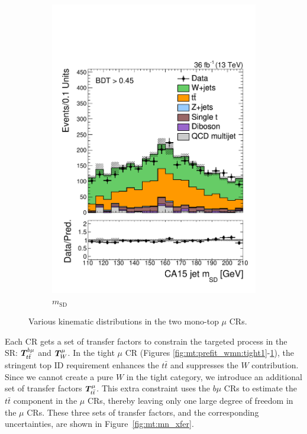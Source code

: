 \begin{figure}[]
\begin{center}
\begin{subfigure}[t]{0.32\textwidth}
            \includegraphics[width=\textwidth]{figures/monotop/prefit/singlemuonw_tight_fj1MSD.pdf}
            \caption{$m_\mathrm{SD}$}
            \label{fig:mt:prefit_wmn:tight2}
        \end{subfigure}
        \caption{Various kinematic distributions in the two mono-top $\mu$ CRs. }
        \label{fig:mt:prefit_wmn}
    \end{center}
\end{figure}

Each CR gets a set of transfer factors to constrain the targeted process in the SR: $\bm{T}^{b\mu}_{t\bar{t}}$ and $\bm{T}^{\mu}_{W}$.
In the tight $\mu$ CR (Figures \ref{fig:mt:prefit_wmn:tight1}-\ref{fig:mt:prefit_wmn:tight2}), the stringent top ID requirement enhances the $t\bar{t}$ and suppresses the $W$ contribution.
Since we cannot create a pure $W$ in the tight category, we introduce an additional set of transfer factors $\bm{T}^{\mu}_{t\bar{t}}$.
This extra constraint uses the $b\mu$ CRs to estimate the $t\bar{t}$ component in the $\mu$ CRs, thereby leaving only one large degree of freedom in the $\mu$ CRs.
These three sets of transfer factors, and the corresponding uncertainties, are shown in Figure~\ref{fig:mt:mn_xfer}.


